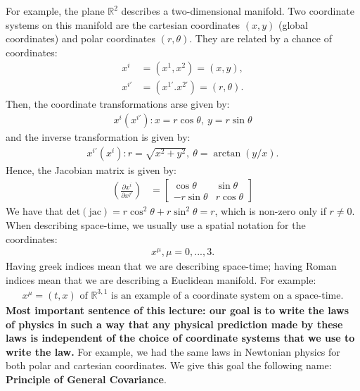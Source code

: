 \documentclass[11pt]{article}
\newcommand{\R}[0]{\mathbb{R}}
\theoremstyle{definition}
\begin{document}
\newline
\newline
For example, the plane \( \R^2 \) describes a two-dimensional manifold. Two coordinate systems on this manifold are the cartesian coordinates \( (x,y) \) (global coordinates) and polar coordinates \( (r, \theta) \). They are related by a chance of coordinates: 
\begin{align*}
	x^i & = (x^1, x^2)  = (x,y), \\
	x^{i'} & = (x^{1'}. x^{2'} )  = (r, \theta).
\end{align*}
Then, the coordinate transformations arse given by: 
\begin{align*}
	x^{i}(x^{i'}): x = r \cos \theta,\ y = r \sin \theta
\end{align*}
and the inverse transformation is given by: 
\begin{align*}
	x^{i'}(x^{i}): r = \sqrt{x^2 + y^2},\ \theta = \arctan (y/x). 
\end{align*} 
Hence, the Jacobian matrix is given by: 
\begin{align*}
	\left( \frac{\partial x^i}{\partial x^{j'}} \right) & = \begin{bmatrix}
		 \cos \theta & \sin \theta \\
		 - r \sin \theta & r \cos \theta 
	\end{bmatrix}
\end{align*}
We have that \( \text{det}(\text{jac}) = r \cos^2 \theta + r \sin^2 \theta = r \), which is non-zero only if \( r \neq 0 \).
\newline
\newline
When describing space-time, we usually use a spatial notation for the coordinates: 
\begin{align*}
	x^\mu, \mu = 0, ..., 3. 
\end{align*}
Having greek indices mean that we are describing space-time; having Roman indices mean that we are describing a Euclidean manifold. For example: 
\begin{align*}
	x^\mu = (t, x) \text{ of } \R^{3,1} \text{ is an example of a coordinate system on a space-time.} 
\end{align*} 
\textbf{Most important sentence of this lecture: our goal is to write the laws of physics in such a way that any physical prediction made by these laws is independent of the choice of coordinate systems that we use to write the law.} For example, we had the same laws in Newtonian physics for both polar and cartesian coordinates. We give this goal the following name: \textbf{Principle of General Covariance}. 
\end{document}
